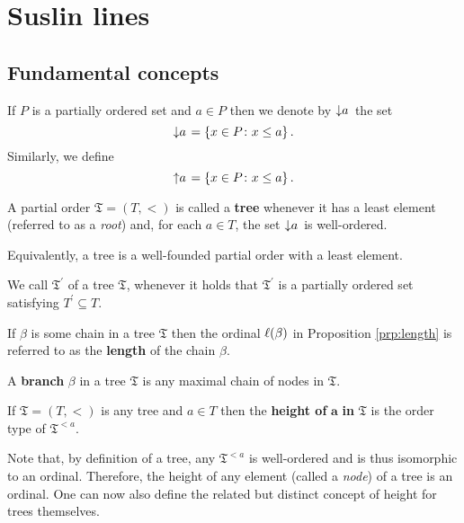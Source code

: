 \chapter{Suslin lines}

\section{Fundamental concepts}

If $P$ is a partially ordered set and $a\in P$ then we denote by $\left\downarrow a\right.$ the
set
\begin{equation}
	\left\downarrow a\right.=\left\lbrace x\in P\colon x\leq a \right\rbrace.
\end{equation}
Similarly, we define
\begin{equation}
	\left\uparrow a\right.=\left\lbrace x\in P\colon x\leq a \right\rbrace.
\end{equation}

\begin{dfn}[Tree]
	A partial order $\mathfrak{T}=(T,<)$ is called a \textbf{tree} whenever it
	has a least element (referred to as a \textit{root}) and, for each $a\in T$, the
	set $\left\downarrow a\right.$ is well-ordered.
\end{dfn}

Equivalently, a tree is a well-founded partial order with a least element.

\begin{dfn}[Subtree]
	We call $\mathfrak{T}^{\prime}$ of a tree $\mathfrak{T}$, whenever it holds
	that $\mathfrak{T}^{\prime}$ is a partially ordered set satisfying
	$T^{\prime}\subseteq T$.
\end{dfn}

\begin{dfn}[Length]
	If $\beta$ is some chain in a tree $\mathfrak{T}$ then the ordinal
	$\ell(\beta)$ in Proposition \ref{prp:length} is referred to as the
	\textbf{length} of the chain $\beta$.
\end{dfn}

\begin{dfn}[Branch]
	A \textbf{branch} $\beta$ in a tree $\mathfrak{T}$ is any maximal chain of nodes in $\mathfrak{T}$.
\end{dfn}

\begin{dfn}[Height]
	If $\mathfrak{T}=(T,<)$ is any tree and $a\in T$ then the \textbf{height of
	}$\bm{a}$\textbf{ in }$\bm{\mathfrak{T}}$ is the order type of
	$\mathfrak{T}^{<a}$.
\end{dfn}

Note that, by definition of a tree, any $\mathfrak{T}^{<a}$ is well-ordered and
is thus isomorphic to an ordinal.  Therefore, the height of any element (called
a \textit{node}) of a tree is an ordinal.  One can now also define the related
but distinct concept of height for trees themselves.

